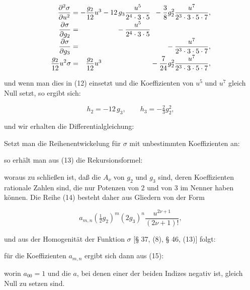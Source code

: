 \[
\begin{array}{r@{}c@{}r@{}r@{}r}
\displaystyle\frac{\partial^2\sigma}{\partial u^2} &{}={}& -\dfrac{g_2}{12}u^3 &{}- 12\,g_3\dfrac{u^5}{2^4\cdot3\cdot5} &{}- \dfrac{3}{8}g_2^2\dfrac{u^7}{2^3\cdot3\cdot5\cdot7},\\[2mm]
\displaystyle\frac{\partial\sigma}{\partial g_2} &{}={}& &{}- \dfrac{u^5}{2^4\cdot3\cdot5} &\\[2mm]
\displaystyle\frac{\partial\sigma}{\partial g_3} &{}={}& & &{}- \dfrac{u^7}{2^3\cdot3\cdot5\cdot7},\\[2mm]
\displaystyle\frac{g_2}{12}u^2\sigma &{}={}& \dfrac{g_2}{12}u^3 & &{}-\dfrac{7}{24}g_2^2\dfrac{u^7}{2^3\cdot3\cdot5\cdot7},
\end{array}
\]

und wenn man dies in (12) einsetzt und die Koeffizienten von $u^5$
und $u^7$ gleich Null setzt, so ergibt sich:

\[
h_2 = -12\,g_3, \qquad h_3 = -\tfrac{2}{3}g_2^2,
\]

und wir erhalten die Differentialgleichung:


Setzt man die Reihenentwickelung für $\sigma$ mit unbestimmten
Koeffizienten an:


so erhält man aus (13) die Rekursionsformel:


woraus zu schließen ist, daß die $A_\nu$ 
von $g_2$ und $g_3$ sind, deren Koeffizienten rationale Zahlen sind,
die nur Potenzen von 2 und von 3 im Nenner haben können. Die Reihe
(14) besteht daher aus Gliedern von der Form

\[
a_{m,n}\left(\tfrac12 g_2\right)^m(2g_3)^n\dfrac{u^{2\nu+1}}{(2\nu+1)!},
\]

und aus der Homogenität der Funktion $\sigma$ [§ 37, (8), § 46,
(13)] folgt:


für die Koeffizienten $a_{m,n}$ ergibt sich dann aus (15):


worin $a_{00}=1$ und die $a$, bei denen einer der beiden Indizes
negativ ist, gleich Null zu setzen sind.

